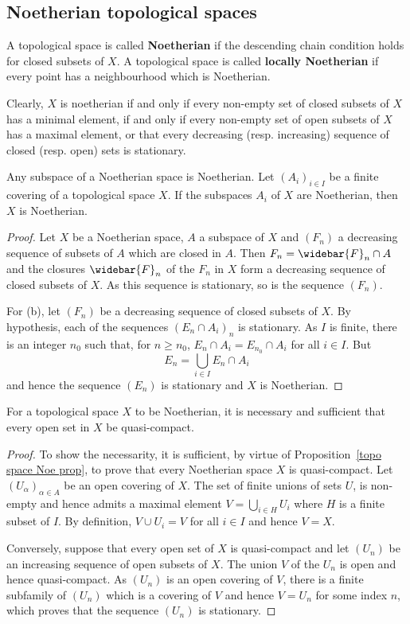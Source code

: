 \subsection{Noetherian topological spaces}
\begin{definition}
A topological space is called \textbf{Noetherian} if the descending chain condition holds for closed subsets of $X$. A topological space is called \textbf{locally Noetherian} if every point has a neighbourhood which is Noetherian.
\end{definition}
Clearly, $X$ is noetherian if and only if every non-empty set of closed subsets of $X$ has a minimal element, if and only if every non-empty set of open subsets of $X$ has a maximal element, or that every decreasing (resp. increasing) sequence of closed (resp. open) sets is stationary.
\begin{proposition}\label{topo space Noe prop}
Any subspace of a Noetherian space is Noetherian. Let $(A_i)_{i\in I}$ be a finite covering of a topological space $X$. If the subspaces $A_i$ of $X$ are Noetherian, then $X$ is Noetherian.
\end{proposition}
\begin{proof}
Let $X$ be a Noetherian space, $A$ a subspace of $X$ and $(F_n)$ a decreasing sequence of subsets of $A$ which are closed in $A$. Then $F_n=\widebar{F}_n\cap A$ and the closures $\widebar{F}_n$ of the $F_n$ in $X$ form a decreasing sequence of closed subsets of $X$. As this sequence is stationary, so is the sequence $(F_n)$.\par
For (b), let $(F_n)$ be a decreasing sequence of closed subsets of $X$. By hypothesis, each of the sequences $(E_n\cap A_i)_n$ is stationary. As $I$ is finite, there is an integer $n_0$ such that, for $n\geq n_0$, $E_n\cap A_i=E_{n_0}\cap A_i$ for all $i\in I$. But
\[E_n=\bigcup_{i\in I}E_n\cap A_i\]
and hence the sequence $(E_n)$ is stationary and $X$ is Noetherian.
\end{proof}
\begin{proposition}\label{topo space Noe iff quasi-compact}
For a topological space $X$ to be Noetherian, it is necessary and sufficient that every open set in $X$ be quasi-compact.
\end{proposition}
\begin{proof}
To show the necessarity, it is sufficient, by virtue of Proposition~\ref{topo space Noe prop}, to prove that every Noetherian space $X$ is quasi-compact. Let $(U_\alpha)_{\alpha\in A}$ be an open covering of $X$. The set of finite unions of sets $U$, is non-empty and hence admits a maximal element $V=\bigcup_{i\in H}U_i$ where $H$ is a finite subset of $I$. By definition, $V\cup U_i=V$ for all $i\in I$ and hence $V=X$.\par
Conversely, suppose that every open set of $X$ is quasi-compact and let $(U_n)$ be an increasing sequence of open subsets of $X$. The union $V$ of the $U_n$ is open and hence quasi-compact. As $(U_n)$ is an open covering of $V$, there is a finite subfamily of $(U_n)$ which is a covering of $V$ and hence $V=U_n$ for some index $n$, which proves that the sequence $(U_n)$ is stationary.
\end{proof}
